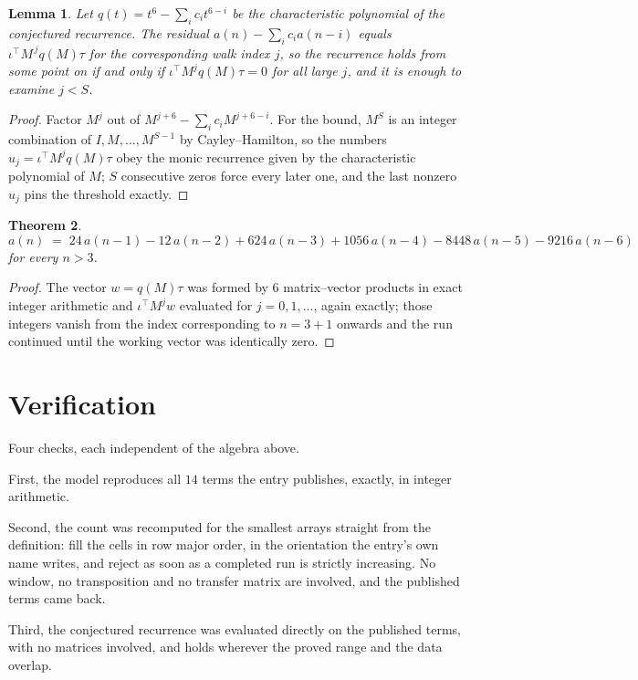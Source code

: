 \documentclass[11pt,a4paper]{article}
\theoremstyle{plain}
\newtheorem{theorem}{Theorem}
\newtheorem{lemma}[theorem]{Lemma}
\theoremstyle{definition}
\begin{document}
\begin{lemma}\label{lem:crit}
Let $q(t)=t^{6}-\sum_i c_it^{6-i}$ be the characteristic polynomial of the
conjectured recurrence. The residual $a(n)-\sum_ic_ia(n-i)$ equals
$\iota^{\!\top}M^{\,j}q(M)\tau$ for the corresponding walk index $j$, so the recurrence
holds from some point on if and only if $\iota^{\!\top}M^{j}q(M)\tau=0$ for all large $j$,
and it is enough to examine $j<S$.
\end{lemma}

\begin{proof}
Factor $M^{j}$ out of $M^{j+6}-\sum_ic_iM^{j+6-i}$. For the bound, $M^{S}$
is an integer combination of $I,M,\dots,M^{S-1}$ by Cayley--Hamilton, so the numbers
$u_j=\iota^{\!\top}M^{j}q(M)\tau$ obey the monic recurrence given by the characteristic
polynomial of $M$; $S$ consecutive zeros force every later one, and the last nonzero $u_j$
pins the threshold exactly.
\end{proof}

\begin{theorem}
\[
a(n)\;=\;24\,a(n-1) - 12\,a(n-2) + 624\,a(n-3) + 1056\,a(n-4) - 8448\,a(n-5) - 9216\,a(n-6)
\]
for every $n>3$.
\end{theorem}

\begin{proof}
The vector $w=q(M)\tau$ was formed by $6$ matrix--vector products in exact integer
arithmetic and $\iota^{\!\top}M^{j}w$ evaluated for $j=0,1,\dots$, again exactly; those
integers vanish from the index corresponding to $n=3+1$ onwards and the run continued
until the working vector was identically zero.
\end{proof}

\section{Verification}

Four checks, each independent of the algebra above.

First, the model reproduces all $14$ terms the entry publishes, exactly, in integer
arithmetic.

Second, the count was recomputed for the smallest arrays straight from the definition: fill the
cells in row major order, in the orientation the entry's own name writes, and reject as soon as
a completed run is strictly increasing. No window, no transposition and no transfer matrix are involved, and
the published terms came back.

Third, the conjectured recurrence was evaluated directly on the published terms, with no
matrices involved, and holds wherever the proved range and the data overlap.
\end{document}
